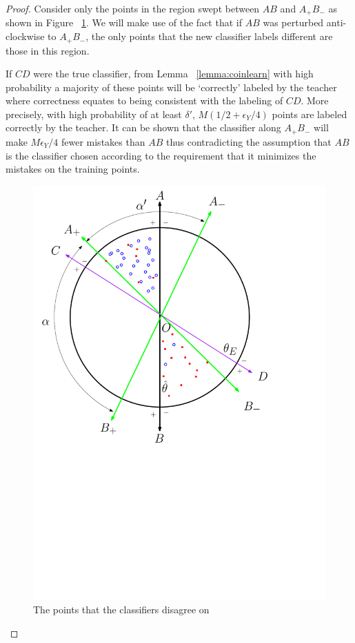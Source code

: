 \begin{proof}
Consider only the points in the region swept between $AB$ and $A_+B_-$ as shown in Figure ~\ref{fig:proof}. We will make use of the fact that if $AB$ was perturbed anti-clockwise to $A_+B_-$, the only points that the new classifier labels different are those in this region.

If $CD$ were the true classifier, from Lemma ~\ref{lemma:coinlearn} with high probability  a majority of these points will be `correctly' labeled by the teacher where correctness equates to being consistent with the labeling of $CD$. More precisely, with high probability of at least $\delta'$, $M(1/2+\epsilon_Y/4)$ points are labeled correctly by the teacher. It can be shown that the classifier along $A_+B_-$ will make $M\epsilon_Y/4$ fewer mistakes than $AB$ thus contradicting the assumption that $AB$ is the classifier chosen according to the requirement that it minimizes the mistakes on the training points.  
\begin{figure}[H]
\centering
   \includegraphics[scale=0.5]{texs/proof.pdf}
   \caption{The points that the classifiers disagree on}
\label{fig:proof}
\end{figure}


\end{proof}

